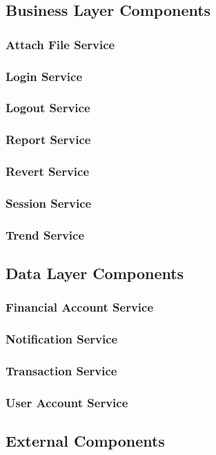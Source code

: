 \documentclass{article}
\begin{document}
\subsection{Business Layer Components}
\subsubsection{Attach File Service}
\subsubsection{Login Service}
\subsubsection{Logout Service}
\subsubsection{Report Service}
\subsubsection{Revert Service}
\subsubsection{Session Service}
\subsubsection{Trend Service}
\subsection{Data Layer Components}
\subsubsection{Financial Account Service}
\subsubsection{Notification Service}
\subsubsection{Transaction Service}
\subsubsection{User Account Service}
\subsection{External Components}
\end{document}
